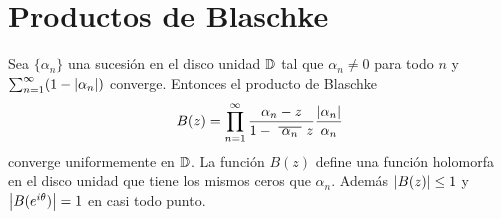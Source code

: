 
\section{Productos de Blaschke}

\begin{prop}
    Sea $\{\alpha_n\}$ una sucesión en el disco unidad $\mathbb{D}$ tal que $\alpha_n \not = 0$ para todo $n$ y $\sum_{n=1}^{\infty} (1 - \left\lvert\alpha_n\right\rvert)$ converge. Entonces el producto de Blaschke
    \begin{equation*}
        B(z) = \prod_{n=1}^{\infty} \frac{\alpha_n - z}{1 - \xbar{\alpha_n}z} \dfrac{\abs{\alpha_n}}{\alpha_n}
    \end{equation*}
    converge uniformemente en $\mathbb{D}$. La función $B(z)$ define una función holomorfa en el disco unidad que tiene los mismos ceros que $\alpha_n$. Además $\left\lvert B(z)\right\rvert \leq 1$ y $\left\lvert B(e^{i \theta})\right\rvert = 1$ en casi todo punto.
\end{prop}


